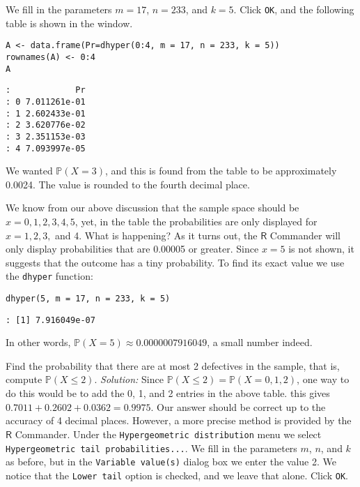 We fill in the parameters \(m = 17\), \(n = 233\), and \(k =
5\). Click \texttt{OK}, and the following table is shown in the window.

\begin{verbatim}
A <- data.frame(Pr=dhyper(0:4, m = 17, n = 233, k = 5))
rownames(A) <- 0:4 
A
\end{verbatim}

\begin{verbatim}
:             Pr
: 0 7.011261e-01
: 1 2.602433e-01
: 2 3.620776e-02
: 3 2.351153e-03
: 4 7.093997e-05
\end{verbatim}

We wanted \(\mathbb{P}(X=3)\), and this is found from the table to be
approximately 0.0024. The value is rounded to the fourth decimal
place.

We know from our above discussion that the sample space should be
\(x=0,1,2,3,4,5\), yet, in the table the probabilities are only
displayed for \(x = 1,2,3,\) and 4. What is happening? As it turns
out, the \(\mathsf{R}\) Commander will only display probabilities that
are 0.00005 or greater. Since \(x=5\) is not shown, it suggests that
the outcome has a tiny probability. To find its exact value we use the
\texttt{dhyper} function:

\begin{verbatim}
dhyper(5, m = 17, n = 233, k = 5)
\end{verbatim}

\begin{verbatim}
: [1] 7.916049e-07
\end{verbatim}

In other words, \(\mathbb{P}(X=5)\approx0.0000007916049\), a small
number indeed.

Find the probability that there are at most 2 defectives in the
sample, that is, compute \(\mathbb{P}(X\leq2)\).  \emph{Solution:} Since
\(\mathbb{P}(X\leq2)=\mathbb{P}(X=0,1,2)\), one way to do this would
be to add the 0, 1, and 2 entries in the above table. this gives
\(0.7011+0.2602+0.0362=0.9975\). Our answer should be correct up to
the accuracy of 4 decimal places. However, a more precise method is
provided by the \(\mathsf{R}\) Commander. Under the \texttt{Hypergeometric
distribution} menu we select \texttt{Hypergeometric tail
probabilities...}. We fill in the parameters \(m\), \(n\), and \(k\)
as before, but in the \texttt{Variable value(s)} dialog box we enter the
value 2. We notice that the \texttt{Lower tail} option is checked, and we
leave that alone. Click \texttt{OK}.

